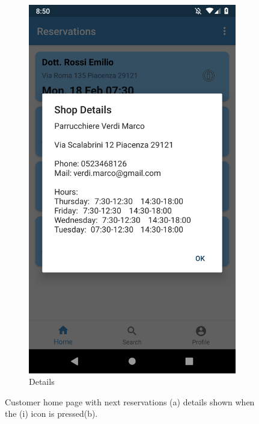 \begin{figure}[h]
\begin{subfigure}{.5\textwidth}
  \includegraphics[height=.4\textheight, keepaspectratio=true]{Img/Screens/Customer_Home_Details}
  \caption{Details}
\end{subfigure}
\caption{Customer home page with next reservations (a) details shown when the (i) icon is pressed(b).}
\end{figure}

